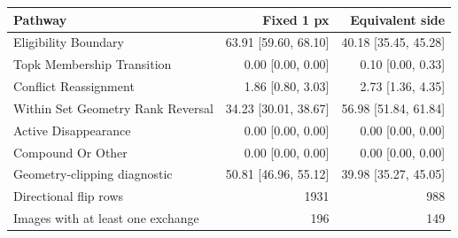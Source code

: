 \begin{tabular}{@{}lrr@{}}
\toprule
Pathway & Fixed 1 px & Equivalent side \\
\midrule
Eligibility Boundary & 63.91 [59.60, 68.10] & 40.18 [35.45, 45.28] \\
Topk Membership Transition & 0.00 [0.00, 0.00] & 0.10 [0.00, 0.33] \\
Conflict Reassignment & 1.86 [0.80, 3.03] & 2.73 [1.36, 4.35] \\
Within Set Geometry Rank Reversal & 34.23 [30.01, 38.67] & 56.98 [51.84, 61.84] \\
Active Disappearance & 0.00 [0.00, 0.00] & 0.00 [0.00, 0.00] \\
Compound Or Other & 0.00 [0.00, 0.00] & 0.00 [0.00, 0.00] \\
Geometry-clipping diagnostic & 50.81 [46.96, 55.12] & 39.98 [35.27, 45.05] \\
\midrule
Directional flip rows & 1931 & 988 \\
Images with at least one exchange & 196 & 149 \\
\bottomrule
\end{tabular}
